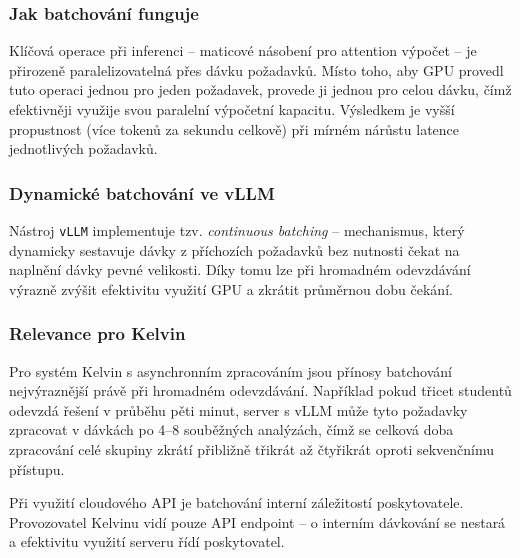 \subsubsection*{Jak batchování funguje}

Klíčová operace při inferenci -- maticové násobení pro attention výpočet -- je přirozeně paralelizovatelná přes dávku požadavků.
Místo toho, aby GPU provedl tuto operaci jednou pro jeden požadavek, provede ji jednou pro celou dávku, čímž efektivněji využije svou paralelní výpočetní kapacitu.
Výsledkem je vyšší propustnost (více tokenů za sekundu celkově) při mírném nárůstu latence jednotlivých požadavků.

\subsubsection*{Dynamické batchování ve vLLM}

Nástroj \texttt{vLLM} implementuje tzv. \emph{continuous batching} \cite{vllm2023} -- mechanismus, který dynamicky sestavuje dávky z příchozích požadavků bez nutnosti čekat na naplnění dávky pevné velikosti.
Díky tomu lze při hromadném odevzdávání výrazně zvýšit efektivitu využití GPU a zkrátit průměrnou dobu čekání.

\subsubsection*{Relevance pro Kelvin}

Pro systém Kelvin s asynchronním zpracováním jsou přínosy batchování nejvýraznější právě při hromadném odevzdávání.
Například pokud třicet studentů odevzdá řešení v průběhu pěti minut, server s vLLM může tyto požadavky zpracovat v dávkách po 4--8 souběžných analýzách, čímž se celková doba zpracování celé skupiny zkrátí přibližně třikrát až čtyřikrát oproti sekvenčnímu přístupu.

Při využití cloudového API je batchování interní záležitostí poskytovatele.
Provozovatel Kelvinu vidí pouze API endpoint -- o interním dávkování se nestará a efektivitu využití serveru řídí poskytovatel.

\endinput
